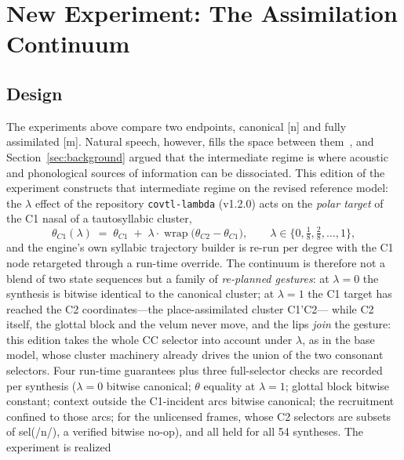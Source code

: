 \documentclass[11pt,a4paper]{article}
\newcommand{\lam}{\lambda}
\begin{document}
\needspace{0.22\textheight}
\section{New Experiment: The Assimilation Continuum}\label{sec:lambda}

\subsection{Design}

The experiments above compare two endpoints, canonical [n] and fully
assimilated [m]. Natural speech, however, fills the space between
them~\citep{ellis2002,dilley2007}, and Section~\ref{sec:background}
argued that the intermediate regime is where acoustic and phonological
sources of information can be dissociated. This edition of the
experiment constructs that intermediate regime on the revised
reference model: the $\lam$ effect of the repository
\texttt{covtl-lambda} (v1.2.0) acts on the \emph{polar target} of the
C1 nasal of a tautosyllabic cluster,
\begin{equation}\label{eq:morph}
\theta_{C1}(\lam) \;=\; \theta_{C1} \;+\; \lam \cdot
\operatorname{wrap}\!\bigl(\theta_{C2}-\theta_{C1}\bigr), \qquad \lam
\in \bigl\{0, \tfrac{1}{8}, \tfrac{2}{8}, \dots, 1\bigr\},
\end{equation}
and the engine's own syllabic trajectory builder is re-run per degree
with the C1 node retargeted through a run-time override. The
continuum is therefore not a blend of two state sequences but a family
of \emph{re-planned gestures}: at $\lam=0$ the synthesis is bitwise
identical to the canonical cluster; at $\lam=1$ the C1 target has
reached the C2 coordinates---the place-assimilated cluster C1'C2---%
while C2 itself, the glottal block and the velum never move, and the
lips \emph{join} the gesture: this edition takes the whole CC
selector into account under $\lam$, as in the base model, whose
cluster machinery already drives the union of the two consonant
selectors. Four run-time guarantees plus three full-selector checks
are recorded per synthesis ($\lam=0$ bitwise canonical; $\theta$
equality at $\lam=1$; glottal block bitwise constant; context
outside the C1-incident arcs bitwise canonical; the recruitment
confined to those arcs; for the unlicensed frames, whose C2
selectors are subsets of sel(/n/), a verified bitwise no-op), and
all held for all 54 syntheses. The experiment is realized
\end{document}
